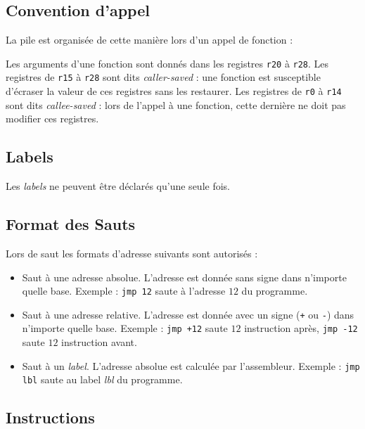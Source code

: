 \documentclass[french, 12pt]{article}
\begin{document}

\subsection*{Convention d'appel}

La pile est organisée de cette manière lors d'un appel de fonction :


Les arguments d'une fonction sont donnés dans les registres \texttt{r20} à \texttt{r28}.
Les registres de \texttt{r15} à \texttt{r28} sont dits \emph{caller-saved} :
une fonction est susceptible d'écraser la valeur de ces registres sans les restaurer.
Les registres de \texttt{r0} à \texttt{r14} sont dits \emph{callee-saved} :
lors de l'appel à une fonction, cette dernière ne doit pas modifier ces registres.

\subsection*{Labels}

Les \emph{labels} ne peuvent être déclarés qu'une seule fois.

\subsection*{Format des Sauts}

Lors de saut les formats d'adresse suivants sont autorisés :
\begin{itemize}
      \item Saut à une adresse absolue. L'adresse est donnée sans signe dans
            n'importe quelle base. Exemple : \verb|jmp 12| saute à l'adresse $12$ du programme.
      \item Saut à une adresse relative. L'adresse est donnée avec un signe
            (\texttt{+} ou \texttt{-}) dans n'importe quelle base. Exemple :
            \verb|jmp +12| saute $12$ instruction après, \verb|jmp -12| saute
            $12$ instruction avant.
      \item Saut à un \emph{label}. L'adresse absolue est calculée par
            l'assembleur. Exemple : \verb|jmp lbl| saute au label \emph{lbl} du
            programme.
\end{itemize}

\subsection*{Instructions}
\end{document}
